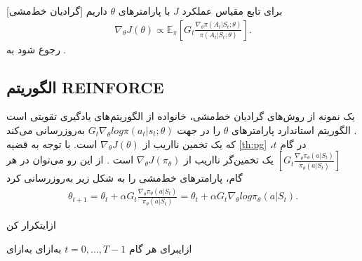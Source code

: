 [گرادیان خط‌مشی] برای تابع مقیاس عملکرد $J$ با پارامتر\nf های $\theta$ داریم
\begin{align}
	\nabla_\theta J(\theta) \propto \mathbb{E}_\pi \left[ G_t \frac{\nabla_\theta \pi (A_t|S_t; \theta)}{\pi(A_t|S_t; \theta)} \right].
	\label{eq:pg}
\end{align}
رجوع شود به 
\cite{suttonbook}.

\subsection{
	الگوریتم
REINFORCE}

یک نمونه از روش‌های گرادیان خط‌مشی، خانواده
از الگوریتم‌های یادگیری تقویتی است
\cite{williams1992simple}.
الگوریتم استاندارد  پارامترهای $\theta$ را در جهت 
$G_t \nabla_\theta  log  \pi (a_t|s_t;\theta)$
 به‌روزرسانی می‌کند که یک تخمین نااریب از
$\nabla_\theta J(\theta)$
است.
با توجه به قضیه 
\ref{th:pg}
در گام $t$،
$\left[ G_t \frac{\nabla_\theta \pi_\theta (a|S_t)}{\pi_\theta (a|S_t)} \right]$
یک تخمین‌گر نااریب از $\nabla_\theta J(\pi_\theta)$ است \cite{suttonbook}. از این رو می‌توان در هر گام، پارامترهای خط‌مشی
 را به شکل زیر به‌روزرسانی کرد
\begin{align}
\theta_{t+1} = \theta_t + \alpha G_t \frac{\nabla_\theta \pi_\theta (a|S_t)}{\pi_\theta (a|S_t)} = \theta_t + \alpha G_t \nabla_\theta log \pi_\theta (a|S_t).
\label{def:updaterule}
\end{align}



‌ازای{تکرار کن}

‌ازای{برای هر گام
$t=0,...,T-1$}
‌به‌ازای
‌به‌ازای

